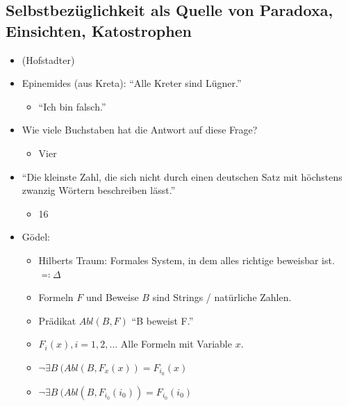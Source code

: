 \subsection{Selbstbezüglichkeit als Quelle von Paradoxa, Einsichten, Katostrophen}
\begin{itemize}
	\item (Hofstadter)
	\item Epinemides (aus Kreta): \enquote{Alle Kreter sind Lügner.}
	\begin{itemize}
		\item \enquote{Ich bin falsch.}
	\end{itemize}
	\item Wie viele Buchstaben hat die Antwort auf diese Frage?
	\begin{itemize}
		\item Vier
	\end{itemize}
	\item \enquote{Die kleinste Zahl, die sich nicht durch einen deutschen Satz mit höchstens zwanzig Wörtern beschreiben lässt.}
	\begin{itemize}
		\item 16
	\end{itemize}
	\item Gödel:
	\begin{itemize}
		\item Hilberts Traum: Formales System, in dem alles richtige beweisbar ist. $\eqqcolon \Delta$
		\item Formeln $F$ und Beweise $B$ sind Strings / natürliche Zahlen.
		\item Prädikat $Abl( B, F )$ \qquad \enquote{B beweist F.}
		\item $F_i( x ) , i = 1 , 2 , \dotsc$ \qquad Alle Formeln mit Variable $x$.
		\item $\neg \exists B~( Abl( B , F_x( x ) ) = F_{i_0}( x )$
		\item $\neg \exists B~( Abl( B , F_{i_0}( i_0 ) ) = F_{i_0}( i_0 )$
	\end{itemize}
\end{itemize}
